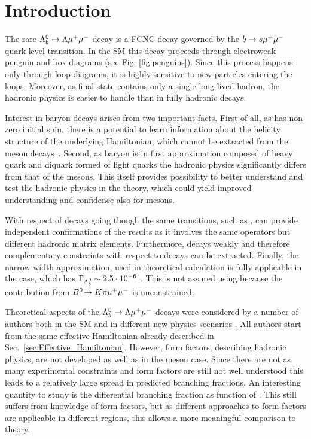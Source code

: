 \chapter{Introduction}
\label{sec:Introduction}

The rare ${{\Lambda}^0_{b}}\rightarrow{\ensuremath{\Lambda}}{\ensuremath{\mu^+\mu^-}}$ decay is a FCNC decay governed by the ${b} \rightarrow {\ensuremath{s}}{\ensuremath{\mu^+\mu^-}}$ quark
level transition. In the SM this decay proceeds through electroweak penguin and \W box diagrams
(see Fig. \ref{fig:penguins}). Since this process happens only through loop diagrams, it is highly sensitive
to new particles entering the loops. Moreover, as final state contains only a single long-lived hadron,
the hadronic physics is easier 
to handle than in fully hadronic decays.

Interest in \Lb baryon decays arises from two important facts.
First of all, as \Lb has non-zero initial spin, there is a potential to learn information about the helicity structure
of the underlying Hamiltonian, which cannot be extracted from the meson decays~\cite{Hiller:2007ur,Mannel:1997xy}.
Second, as \Lb baryon is in first approximation
composed of heavy quark and diquark formed of light quarks the hadronic physics significantly differs from that of the mesons.
This itself provides possibility to better understand and test the hadronic physics in the theory,
which could yield improved understanding and confidence also for mesons.

With respect of \Bz decays going though the same transitions, such as \BdToKstmm, \Lz can provide independent
confirmations of the results as it involves the same operators but different hadronic matrix elements.
Furthermore, \Lz decays weakly and therefore complementary constraints with respect to \Bz decays can be extracted.
Finally, the narrow width approximation, used in theoretical calculation is fully applicable in the \Lb case,
which has $\Gamma_{{{\Lambda}^0_{b}}} \sim 2.5 \cdot 10^{-6}$ \ev. This is not assured using \BdToKstmm because
the contribution from $\decay{\Bz}{K\pi\mumu}$ is unconstrained.

Theoretical aspects of the ${{\Lambda}^0_{b}}\rightarrow{\ensuremath{\Lambda}}{\ensuremath{\mu^+\mu^-}}$ decays were considered by a number of authors both in the SM and in different new physics scenarios
\cite{Aslam:2008hp,Wang:2008sm,Huang:1998ek,Chen:2001ki,Chen:2001zc,Chen:2001sj,Zolfagharpour:2007eh,Mott:2011cx,Aliev:2010uy,Mohanta:2010eb,Sahoo:2011yb}.
All authors start from the same effective Hamiltonian already described in Sec.~\ref{sec:Effective_Hamiltonian}. However, form factors, describing hadronic physics, are not developed as well as in the meson case.
Since there are not as many experimental constraints and form factors are still not well understood this leads to a relatively
large spread in predicted branching fractions. An interesting quantity to study is the differential branching fraction as
function of \qsq. This still suffers from knowledge of form factors, but as different
approaches to form factors are applicable in different \qsq regions, this allows a more meaningful comparison to theory.

